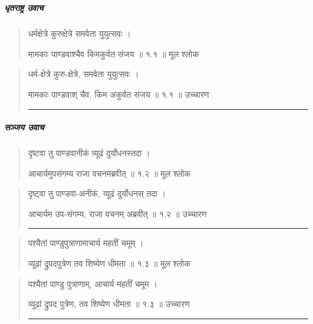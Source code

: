 \chapter{}
\sanskrit

\paragraph{\sanskrit धृतराष्ट्र उवाच}

\begin{quotation}
	धर्मक्षेत्रे कुरुक्षेत्रे समवेता युयुत्सवः  । 
	
	मामकाः पाण्डवाश्चैव किमकुर्वत संजय  ॥ १.१ ॥  मूल श्लोक

\end{quotation}

\begin{quotation}
धर्म-क्षेत्रे कुरु-क्षेत्रे, समवेता युयुत्सवः  । 

मामकाः पाण्डवाश् चैव, किम अकुर्वत संजय   ॥ १.१ ॥   उच्चारण

\noindent\rule{16cm}{0.4pt} 
\end{quotation}

\paragraph{\sanskrit सञ्जय उवाच}

\begin{quotation}
दृष्टवा तु पाण्डवानीकं व्यूढं दुर्योधनस्तदा  । 

आचार्यमुपसंगम्य राजा वचनमब्रवीत्‌  ॥ १.२ ॥  मूल श्लोक
\end{quotation}

\begin{quotation}

दृष्ट्वा तु पाण्डवा-अनीकं, व्यूढं दुर्योधनस् तदा  । 

आचार्यम उप-संगम्य, राजा वचनम् अब्रवीत्  ॥ १.२ ॥  उच्चारण

\noindent\rule{16cm}{0.4pt} 
\end{quotation}


\begin{quotation} 

पश्यैतां पाण्डुपुत्राणामाचार्य महतीं चमूम्‌  । 

व्यूढां द्रुपदपुत्रेण तव शिष्येण धीमता  ॥ १.३ ॥  मूल श्लोक
\end{quotation}

\begin{quotation} 

पश्यैतां पाण्डु पुत्राणाम्, आचार्य महतीं चमूम  ।  

व्यूढां द्रुपद पुत्रेण, तव शिष्येण धीमता  ॥ १.३ ॥  उच्चारण

\noindent\rule{16cm}{0.4pt} 
\end{quotation}


